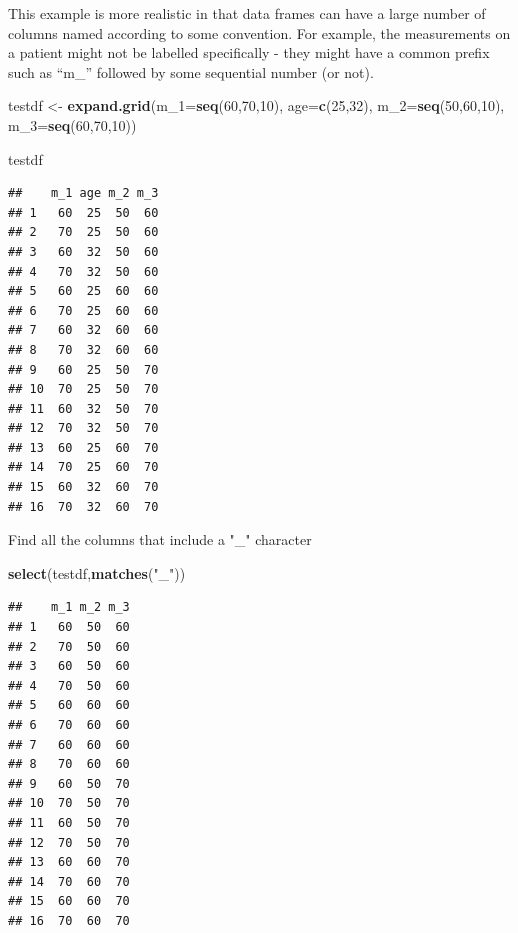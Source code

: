 \documentclass[]{book}
\newenvironment{Shaded}{\begin{snugshade}}{\end{snugshade}}
\newcommand{\DataTypeTok}[1]{\textcolor[rgb]{0.13,0.29,0.53}{#1}}
\newcommand{\DecValTok}[1]{\textcolor[rgb]{0.00,0.00,0.81}{#1}}
\newcommand{\KeywordTok}[1]{\textcolor[rgb]{0.13,0.29,0.53}{\textbf{#1}}}
\newcommand{\NormalTok}[1]{#1}
\newcommand{\StringTok}[1]{\textcolor[rgb]{0.31,0.60,0.02}{#1}}
\begin{document}
This example is more realistic in that data frames can have a large number of columns named according to some convention. For example, the measurements on a patient might not be labelled specifically - they might have a common prefix such as ``m\_'' followed by some sequential number (or not).

\begin{Shaded}
\begin{Highlighting}[]
\NormalTok{testdf <-}\StringTok{ }\KeywordTok{expand.grid}\NormalTok{(}\DataTypeTok{m_1=}\KeywordTok{seq}\NormalTok{(}\DecValTok{60}\NormalTok{,}\DecValTok{70}\NormalTok{,}\DecValTok{10}\NormalTok{),}
                      \DataTypeTok{age=}\KeywordTok{c}\NormalTok{(}\DecValTok{25}\NormalTok{,}\DecValTok{32}\NormalTok{),}
                      \DataTypeTok{m_2=}\KeywordTok{seq}\NormalTok{(}\DecValTok{50}\NormalTok{,}\DecValTok{60}\NormalTok{,}\DecValTok{10}\NormalTok{),}
                      \DataTypeTok{m_3=}\KeywordTok{seq}\NormalTok{(}\DecValTok{60}\NormalTok{,}\DecValTok{70}\NormalTok{,}\DecValTok{10}\NormalTok{))}
\end{Highlighting}
\end{Shaded}

\begin{Shaded}
\begin{Highlighting}[]
\NormalTok{testdf}
\end{Highlighting}
\end{Shaded}

\begin{verbatim}
##    m_1 age m_2 m_3
## 1   60  25  50  60
## 2   70  25  50  60
## 3   60  32  50  60
## 4   70  32  50  60
## 5   60  25  60  60
## 6   70  25  60  60
## 7   60  32  60  60
## 8   70  32  60  60
## 9   60  25  50  70
## 10  70  25  50  70
## 11  60  32  50  70
## 12  70  32  50  70
## 13  60  25  60  70
## 14  70  25  60  70
## 15  60  32  60  70
## 16  70  32  60  70
\end{verbatim}

Find all the columns that include a "\_" character

\begin{Shaded}
\begin{Highlighting}[]
\KeywordTok{select}\NormalTok{(testdf,}\KeywordTok{matches}\NormalTok{(}\StringTok{"_"}\NormalTok{))}
\end{Highlighting}
\end{Shaded}

\begin{verbatim}
##    m_1 m_2 m_3
## 1   60  50  60
## 2   70  50  60
## 3   60  50  60
## 4   70  50  60
## 5   60  60  60
## 6   70  60  60
## 7   60  60  60
## 8   70  60  60
## 9   60  50  70
## 10  70  50  70
## 11  60  50  70
## 12  70  50  70
## 13  60  60  70
## 14  70  60  70
## 15  60  60  70
## 16  70  60  70
\end{verbatim}
\end{document}
